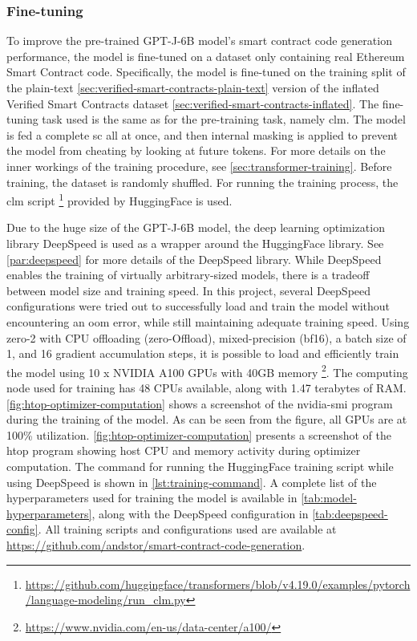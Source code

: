 
\subsubsection{Fine-tuning}
\label{sec:rq1-fine-tuning}
To improve the pre-trained GPT-J-6B model's smart contract code generation performance, the model is fine-tuned on a dataset only containing real Ethereum Smart Contract code. Specifically, the model is fine-tuned on the training split of the plain-text \cref{sec:verified-smart-contracts-plain-text} version of the inflated Verified Smart Contracts dataset \cref{sec:verified-smart-contracts-inflated}. The fine-tuning task used is the same as for the pre-training task, namely \acrfull{clm}. The model is fed a complete \acrshort{sc} all at once, and then internal masking is applied to prevent the model from cheating by looking at future tokens. For more details on the inner workings of the training procedure, see \cref{sec:transformer-training}. Before training, the dataset is randomly shuffled. For running the training process, the \acrshort{clm} script \footnote{\url{https://github.com/huggingface/transformers/blob/v4.19.0/examples/pytorch/language-modeling/run_clm.py}} provided by HuggingFace is used.

Due to the huge size of the GPT-J-6B model, the deep learning optimization library DeepSpeed \cite{deepspeed} is used as a wrapper around the HuggingFace library. See \cref{par:deepspeed} for more details of the DeepSpeed library. While DeepSpeed enables the training of virtually arbitrary-sized models, there is a tradeoff between model size and training speed. In this project, several DeepSpeed configurations were tried out to successfully load and train the model without encountering an \acrfull{oom} error, while still maintaining adequate training speed. Using \acrshort{zero}-2 with CPU offloading (\acrshort{zero}-Offload), mixed-precision (\acrshort{bf16}), a batch size of 1, and 16 gradient accumulation steps, it is possible to load and efficiently train the model using 10 x NVIDIA A100 GPUs with 40GB memory \footnote{\url{https://www.nvidia.com/en-us/data-center/a100/}}. The computing node used for training has 48 CPUs available, along with 1.47 terabytes of RAM. \cref{fig:htop-optimizer-computation} shows a screenshot of the nvidia-smi program during the training of the model. As can be seen from the figure, all GPUs are at 100\% utilization. \cref{fig:htop-optimizer-computation} presents a screenshot of the htop program showing host CPU and memory activity during optimizer computation. The command for running the HuggingFace training script while using DeepSpeed is shown in \cref{lst:training-command}. A complete list of the hyperparameters used for training the model is available in \cref{tab:model-hyperparameters}, along with the DeepSpeed configuration in \cref{tab:deepspeed-config}. All training scripts and configurations used are available at \url{https://github.com/andstor/smart-contract-code-generation}.

